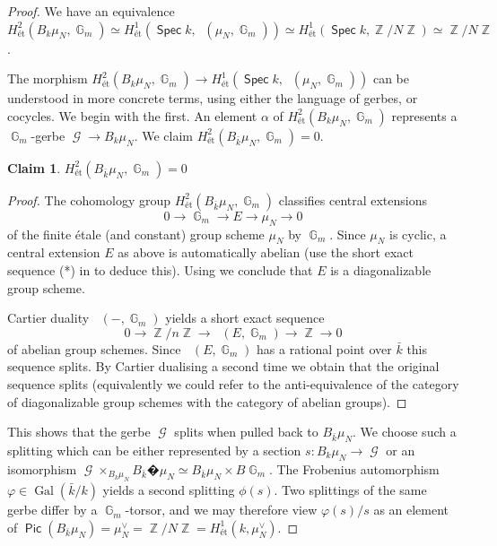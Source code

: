 \documentclass{article}
\DeclareMathOperator{\Hom}{\mathsf{Hom}}
\DeclareMathOperator{\Zb}{\mathbb{Z}}
\DeclareMathOperator{\Gal}{Gal}
\DeclareMathOperator{\G}{\mathbb{G}}
\DeclareMathOperator{\Gg}{\mathcal{G}}
\DeclareMathOperator{\Spec}{\mathsf{Spec}}
\DeclareMathOperator{\Hhom}{\underline{\Hom}}
\DeclareMathOperator{\Pic}{\mathsf{Pic}}
\theoremstyle{definition}
\newtheorem{rmk}[definition]{Remark}
\theoremstyle{plain}
\newtheorem{claim}[definition]{Claim}
\begin{document}
\begin{proof}
We have an equivalence $H^2_{\text{\'et}}(B_k\mu_N,\G_m) \simeq H^1_{\text{\'et}}(\Spec k,\Hhom(\mu_N,\G_m)) \simeq H^1_{\text{\'et}}(\Spec k,\Zb/N\Zb) \simeq \Zb/N\Zb$. 

The morphism $H^2_{\text{\'et}}(B_k\mu_N,\G_m) \to H^1_{\text{\'et}}(\Spec k,\Hhom(\mu_N,\G_m))$ can be understood in more concrete terms, using either the language of gerbes, or cocycles. We begin with the first. An element $\alpha$ of $H^2_{\text{\'et}}(B_k\mu_N,\G_m)$ represents a $\G_m$-gerbe $\Gg \to B_k\mu_N$. We claim $H^2_{\text{\'et}}(B_{\bar{k}}\mu_N,\G_m) = 0$. 
\begin{claim}
$H^2_{\text{\'et}}(B_{\bar{k}}\mu_N,\G_m) = 0$
\end{claim}

\begin{proof}
The cohomology group $H^2_{\text{\'et}}(B_{\bar{k}}\mu_N,\G_m)$ classifies central extensions 
$$0 \to \G_m \to E \to \mu_N \to 0$$
of the finite \'etale (and constant) group scheme $\mu_N$ by $\G_m$. Since $\mu_N$ is cyclic, a central extension $E$ as above is automatically abelian (use the short exact sequence (*) in \cite{prasad} to deduce this). Using \cite[Exp. 9 Prop. 8.2]{MR0274459} we conclude that $E$ is a diagonalizable group scheme. 

Cartier duality $\Hhom(-,\G_m)$ yields a short exact sequence
$$0 \to \Zb/n\Zb \to \Hhom(E,\G_m) \to \Zb \to 0$$
of abelian group schemes. Since $\Hhom(E,\G_m)$ has a rational point over $\bar{k}$ this sequence splits. By Cartier dualising a second time we obtain that the original sequence splits (equivalently we could refer to the anti-equivalence of the category of diagonalizable group schemes with the category of abelian groups). 
\end{proof}

This shows that the gerbe $\Gg$ splits when pulled back to $B_{\bar{k}}\mu_N$. We choose such a splitting which can be either represented by a section $s\colon B_k\mu_N \to \Gg$ or an isomorphism $\Gg \times_{B_k\mu_N} B_{\bar{k}}�\mu_N \simeq B_{\bar{k}}\mu_N \times B\G_m$.  The Frobenius automorphism $\varphi \in \Gal(\bar{k}/k)$ yields a second splitting $\phi(s)$. Two splittings of the same gerbe differ by a $\G_m$-torsor, and we may therefore view $\varphi(s)/s$ as an element of $\Pic(B_{\bar{k}}\mu_N) = \mu_N^{\vee} = \Zb/N\Zb = H^1_{\text{\'et}}(k,\mu_N^{\vee})$.


\end{proof}
\end{document}
